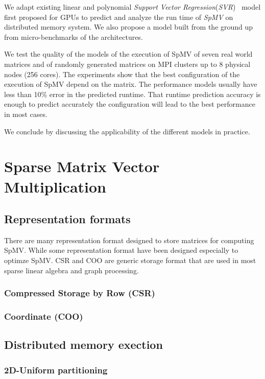 \documentclass[sigconf,review,anonymous]{acmart}
\begin{document}
We adapt existing linear and polynomial \textit{Support Vector
  Regression}(\textit{SVR})~\cite{awad2015support} model first
proposed for GPUs to predict and analyze the run time of \textit{SpMV}
on distributed memory system. We also propose a model built from the
ground up from micro-benchmarks of the architectures.

We test the quality of the models of the execution of SpMV of seven
real world matrices and of randomly generated matrices on MPI clusters
up to 8 physical nodes (256 cores). The experiments show that the best
configuration of the execution of SpMV depend on the matrix. The
performance models usually have less than 10\% error in the predicted
runtime. That runtime prediction accuracy is enough to predict
accurately the configuration will lead to the best performance in most
cases.

We conclude by discussing the applicability of the different models in
practice.

\section{Sparse Matrix Vector Multiplication}

\subsection{Representation formats}

There are many representation format designed to store matrices for
computing SpMV. While some representation format have been designed
especially to optimze SpMV. CSR and COO are generic storage format
that are used in most sparse linear algebra and graph processing.

\subsubsection{Compressed Storage by Row (CSR)}

\subsubsection{Coordinate  (COO)}



\subsection{Distributed memory exection}


\subsubsection{2D-Uniform partitioning}
\end{document}
